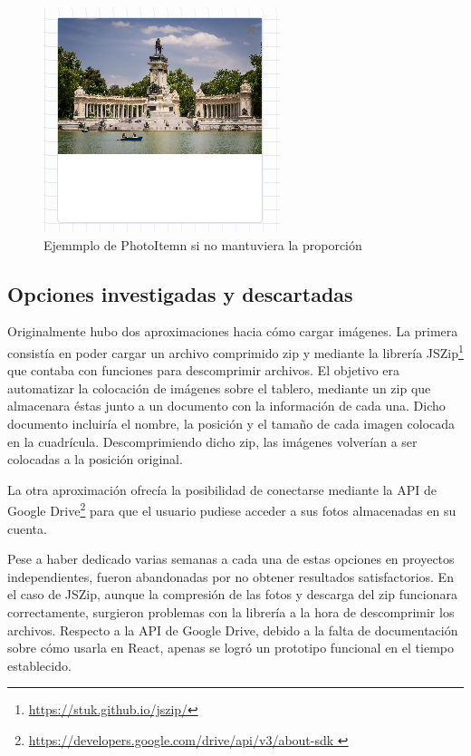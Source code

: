 \begin{figure}[h!]
	\centering
	\includegraphics[width=0.7\linewidth]{Imagenes/Bitmap/photoItemError}
	\caption{Ejemmplo de PhotoItemn si no mantuviera la proporción}
	\label{fig:photoitemerror}
\end{figure}


\subsection{Opciones investigadas y descartadas}

Originalmente hubo dos aproximaciones hacia cómo cargar imágenes. La primera consistía en poder cargar un archivo comprimido zip y mediante la librería JSZip\footnote{\url{https://stuk.github.io/jszip/}} que contaba con funciones para descomprimir archivos. El objetivo era automatizar la colocación de imágenes sobre el tablero, mediante un zip que almacenara éstas junto a un documento con la información de cada una. Dicho documento incluiría el nombre, la posición y el tamaño de cada imagen colocada en la cuadrícula. Descomprimiendo dicho zip, las imágenes volverían a ser colocadas a la posición original.

La otra aproximación ofrecía la posibilidad de conectarse mediante la API de Google Drive\footnote{\url{https://developers.google.com/drive/api/v3/about-sdk }} para que el usuario pudiese acceder a sus fotos almacenadas en su cuenta. 

Pese a haber dedicado varias semanas a cada una de estas opciones en proyectos independientes, fueron abandonadas por no obtener resultados satisfactorios. En el caso de JSZip, aunque la compresión de las fotos y descarga del zip funcionara correctamente, surgieron problemas con la librería a la hora de descomprimir los archivos. Respecto a la API de Google Drive, debido a la falta de documentación sobre cómo usarla en React, apenas se logró un prototipo funcional en el tiempo establecido. 

